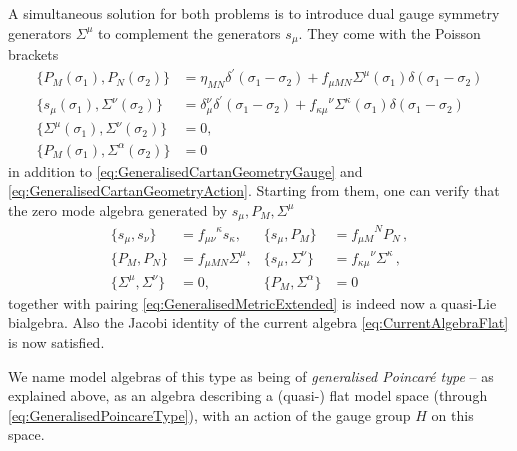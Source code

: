 \documentclass[11pt,a4paper]{article}
\numberwithin{equation}{section}
\begin{document}
A simultaneous solution for both problems \cite{Polacek:2013nla} is to introduce dual gauge symmetry generators $\Sigma^\mu$ to complement the generators $s_\mu$. They come with the Poisson brackets
\begin{align}
    \{ P_M (\sigma_1) , P_N (\sigma_2) \} &= \eta_{MN} \delta^\prime (\sigma_1-\sigma_2)  + f_{\mu MN} \Sigma^\mu (\sigma_1) \delta(\sigma_1 - \sigma_2) \nonumber \\
    \{ s_\mu(\sigma_1), \Sigma^\nu(\sigma_2) \} &= \delta_\mu^\nu \delta^\prime(\sigma_1 - \sigma_2)  + {f_{\kappa \mu}}^\nu \Sigma^\kappa(\sigma_1)  \delta(\sigma_1- \sigma_2) \nonumber \\
    \{ \Sigma^\mu(\sigma_1) , \Sigma^\nu(\sigma_2) \} &= 0 , \nonumber \\
    \{ P_M(\sigma_1) , \Sigma^\alpha(\sigma_2) \} &= 0 \label{eq:CurrentAlgebraFlat}
\end{align}
in addition to \eqref{eq:GeneralisedCartanGeometryGauge} and \eqref{eq:GeneralisedCartanGeometryAction}. Starting from them, one can verify that the zero mode algebra generated by $s_\mu,P_M,\Sigma^\mu$ 
\begin{align} \label{zeromode}
  \{s_\mu, s_\nu\} &= {f_{\mu \nu}}^\kappa s_\kappa, & \{ s_\mu , P_M \} &= {f_{\mu M}}^N P_N\,, \nonumber \\
  \{ P_M, P_N \} &=  f_{\mu MN} \Sigma^\mu, & \{ s_\mu, \Sigma^\nu \} &= {f_{\kappa \mu}}^\nu \Sigma^\kappa\,, \nonumber \\
  \{ \Sigma^\mu , \Sigma^\nu \} &= 0 , & \{ P_M , \Sigma^\alpha \} &= 0
\end{align}
together with pairing \eqref{eq:GeneralisedMetricExtended} is indeed now a quasi-Lie bialgebra. Also the Jacobi identity of the current algebra \eqref{eq:CurrentAlgebraFlat} is now satisfied.

We name model algebras of this type as being of \textit{generalised Poincar\'e type} -- as explained above, as an algebra describing a (quasi-) flat model space (through \eqref{eq:GeneralisedPoincareType}), with an action of the gauge group $H$ on this space.
\end{document}
